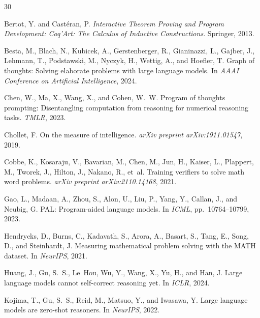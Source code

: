 \documentclass[11pt,a4paper]{article}
\begin{document}
\begin{thebibliography}{30}

Bertot, Y. and Cast{\'e}ran, P.
\newblock \emph{Interactive Theorem Proving and Program Development: Coq'Art: The Calculus of Inductive Constructions}.
\newblock Springer, 2013.

Besta, M., Blach, N., Kubicek, A., Gerstenberger, R., Gianinazzi, L., Gajber, J., Lehmann, T., Podstawski, M., Nyczyk, H., Wettig, A., and Hoefler, T.
\newblock Graph of thoughts: Solving elaborate problems with large language models.
\newblock In \emph{AAAI Conference on Artificial Intelligence}, 2024.

Chen, W., Ma, X., Wang, X., and Cohen, W.~W.
\newblock Program of thoughts prompting: Disentangling computation from reasoning for numerical reasoning tasks.
\newblock \emph{TMLR}, 2023.

Chollet, F.
\newblock On the measure of intelligence.
\newblock \emph{arXiv preprint arXiv:1911.01547}, 2019.

Cobbe, K., Kosaraju, V., Bavarian, M., Chen, M., Jun, H., Kaiser, L., Plappert, M., Tworek, J., Hilton, J., Nakano, R., et~al.
\newblock Training verifiers to solve math word problems.
\newblock \emph{arXiv preprint arXiv:2110.14168}, 2021.

Gao, L., Madaan, A., Zhou, S., Alon, U., Liu, P., Yang, Y., Callan, J., and Neubig, G.
\newblock PAL: Program-aided language models.
\newblock In \emph{ICML}, pp.\ 10764--10799, 2023.

Hendrycks, D., Burns, C., Kadavath, S., Arora, A., Basart, S., Tang, E., Song, D., and Steinhardt, J.
\newblock Measuring mathematical problem solving with the MATH dataset.
\newblock In \emph{NeurIPS}, 2021.

Huang, J., Gu, S.~S., Le~Hou, Wu, Y., Wang, X., Yu, H., and Han, J.
\newblock Large language models cannot self-correct reasoning yet.
\newblock In \emph{ICLR}, 2024.

Kojima, T., Gu, S.~S., Reid, M., Matsuo, Y., and Iwasawa, Y.
\newblock Large language models are zero-shot reasoners.
\newblock In \emph{NeurIPS}, 2022.


\end{thebibliography}
\end{document}
